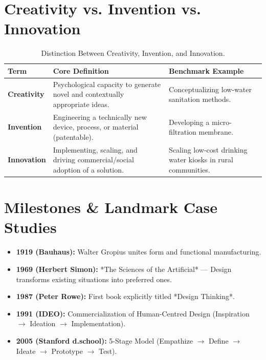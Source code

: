 \section{Creativity vs. Invention vs. Innovation}

\begin{table}[h!]
\centering
\small
\renewcommand{\arraystretch}{1.3}
\begin{tabularx}{\linewidth}{p{2.8cm}X X}
\toprule
\textbf{Term} & \textbf{Core Definition} & \textbf{Benchmark Example} \\
\midrule
\textbf{Creativity} & Psychological capacity to generate novel and contextually appropriate ideas. & Conceptualizing low-water sanitation methods. \\
\textbf{Invention} & Engineering a technically new device, process, or material (patentable). & Developing a micro-filtration membrane. \\
\textbf{Innovation} & Implementing, scaling, and driving commercial/social adoption of a solution. & Scaling low-cost drinking water kiosks in rural communities. \\
\bottomrule
\end{tabularx}
\caption{Distinction Between Creativity, Invention, and Innovation.}
\end{table}

\section{Milestones \& Landmark Case Studies}

\begin{itemize}[leftmargin=1.2em, itemsep=2pt]
    \item \textbf{1919 (Bauhaus):} Walter Gropius unites form and functional manufacturing.
    \item \textbf{1969 (Herbert Simon):} *The Sciences of the Artificial* --- Design transforms existing situations into preferred ones.
    \item \textbf{1987 (Peter Rowe):} First book explicitly titled *Design Thinking*.
    \item \textbf{1991 (IDEO):} Commercialization of Human-Centred Design (Inspiration $\rightarrow$ Ideation $\rightarrow$ Implementation).
    \item \textbf{2005 (Stanford d.school):} 5-Stage Model (Empathize $\rightarrow$ Define $\rightarrow$ Ideate $\rightarrow$ Prototype $\rightarrow$ Test).
\end{itemize}

